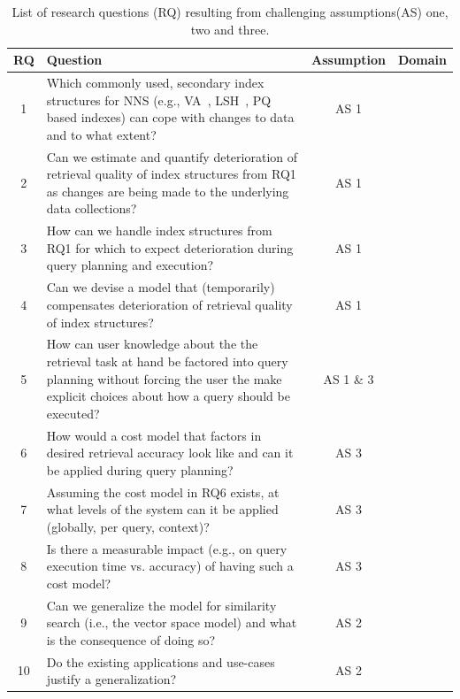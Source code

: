 \begin{table}[h!]
    \centering
    \caption{List of research questions (RQ) resulting from challenging assumptions(AS) one, two and three.}
    \begin{tabular}{|c|p{10cm}|c|c|} 
     \hline
     \textbf{RQ} & \textbf{Question} & \textbf{Assumption} & \textbf{Domain} \\ [0.5ex] 
     \hline\hline
     1 & Which commonly used, secondary index structures for NNS (e.g., VA~\cite{Weber:1998va}, LSH~\cite{Indyk:1998lsh}, PQ~\cite{jegou:2011pq} based indexes) can cope with changes to data and to what extent? & AS 1 &\\ 
     2 & Can we estimate and quantify deterioration of retrieval quality of index structures from RQ1 as changes are being made to the underlying data collections? & AS 1 & \\ 
     3 & How can we handle index structures from RQ1 for which to expect deterioration during query planning and execution? & AS 1 & \\
     4 & Can we devise a model that (temporarily) compensates deterioration of retrieval quality of index structures? & AS 1 & \\
     5 & How can user knowledge about the the retrieval task at hand be factored into query planning without forcing the user the make explicit choices about how a query should be executed? & AS 1 \& 3 & \\
     6 & How would a cost model that factors in desired retrieval accuracy look like and can it be applied during query planning? & AS 3 & \\ 
     7 & Assuming the cost model in RQ6 exists, at what levels of the system can it be applied (globally, per query, context)? & AS 3 & \\ 
     8 & Is there a measurable impact (e.g., on query execution time vs. accuracy) of having such a cost model? & AS 3 & \\ 
     9 & Can we generalize the model for similarity search (i.e., the vector space model) and what is the consequence of doing so? & AS 2 & \\ 
     10 & Do the existing applications and use-cases justify a generalization? & AS 2 & \\ 
     \hline
    \end{tabular}
    \label{table:research_questions}
\end{table}


